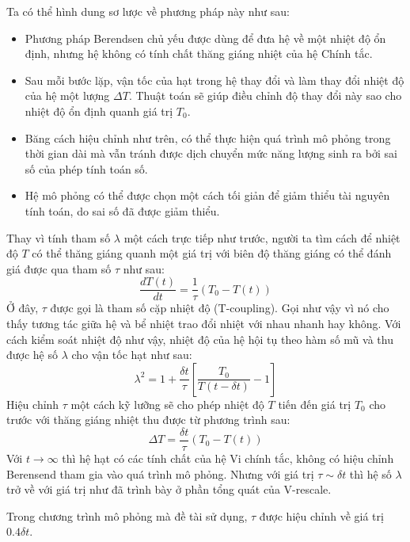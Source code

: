 \documentclass[12pt,a4paper,reqno, oneside]{book}
\begin{document}
			Ta có thể hình dung sơ lược về phương pháp này như sau:
			\begin{itemize}
			\item Phương pháp Berendsen chủ yếu được dùng để đưa hệ về một nhiệt độ ổn định, nhưng hệ không có tính chất thăng giáng nhiệt của hệ Chính tắc.
			\item Sau mỗi bước lặp, vận tốc của hạt trong hệ thay đổi và làm thay đổi nhiệt độ của hệ một lượng $\Delta T$. Thuật toán sẽ giúp điều chỉnh độ thay đổi này sao cho nhiệt độ ổn định quanh giá trị $T_{0}$.
			\item Băng cách hiệu chỉnh như trên, có thể thực hiện quá trình mô phỏng trong thời gian dài mà vẫn tránh được dịch chuyển mức năng lượng sinh ra bởi sai số của phép tính toán số.
			\item Hệ mô phỏng có thể được chọn một cách tối giản để giảm thiểu tài nguyên tính toán, do sai số đã được giảm thiểu.
			\end{itemize}
			Thay vì tính tham số $\lambda$ một cách trực tiếp như trước, người ta tìm cách để nhiệt độ $T$ có thể thăng giáng quanh một giá trị với biên độ thăng giáng có thể đánh giá được qua tham số $\tau$ như sau:
			\begin{equation}
			\dfrac{dT\left(t\right)}{dt} = \dfrac{1}{\tau}\left(T_{0}-T\left(t\right)\right)
			\label{exp-v-r}
			\end{equation}
			Ở đây, $\tau$ được gọi là tham số cặp nhiệt độ (T-coupling). Gọi như vậy vì nó cho thấy tương tác giữa hệ và bể nhiệt trao đổi nhiệt với nhau nhanh hay không. Với cách kiểm soát nhiệt độ như vậy, nhiệt độ của hệ hội tụ theo hàm số mũ và thu được hệ số $\lambda$ cho vận tốc hạt như sau:
			\begin{equation}
			\lambda^{2} = 1 + \dfrac{\delta t}{\tau}\left[\dfrac{T_{0}}{T\left(t-\delta t\right)}-1\right]
			\end{equation}
			Hiệu chỉnh $\tau$ một cách kỹ lưỡng sẽ cho phép nhiệt độ $T$ tiến đến giá trị $T_{0}$ cho trước với thăng giáng nhiệt thu được từ phương trình sau:
			\begin{equation}
			\Delta T = \dfrac{\delta t}{\tau}\left(T_{0}-T\left(t\right)\right)
			\end{equation}
			Với $t\rightarrow \infty$ thì hệ hạt có các tính chất của hệ Vi chính tắc, không có hiệu chỉnh Berensend tham gia vào quá trình mô phỏng. Nhưng với giá trị $\tau \sim \delta t$ thì hệ số $\lambda$ trở về với giá trị như đã trình bày ở phần tổng quát của V-rescale.
			
			Trong chương trình mô phỏng mà đề tài sử dụng, $\tau$ được hiệu chỉnh về giá trị $0.4\delta t$.
			
\end{document}
